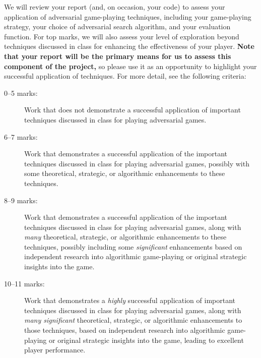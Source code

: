 \documentclass[]{article}
\begin{document}
\begin{itemize}
        We will review your report (and, on occasion, your code\footnotemark)
        to assess your application of adversarial game-playing techniques,
        including
        your game-playing strategy,
        your choice of adversarial search algorithm, and
        your evaluation function.
        For top marks, we will also assess your level of exploration beyond
        techniques discussed in class for enhancing the effectiveness of your
        player.
        \textbf{Note that your report will be the primary means for us to
        assess this component of the project,} so please use it as an
        opportunity to highlight your successful application of techniques.
        For more detail, see the following criteria:

        \begin{description}
            \item [0--5 marks:]
                Work that does not demonstrate a successful application of
                important techniques discussed in class for playing
                adversarial games.
            \item [6--7 marks:]
                Work that demonstrates a successful application of the
                important techniques discussed in class for playing
                adversarial games,
                possibly with some theoretical, strategic, or algorithmic
                enhancements to these techniques.
            \item [8--9 marks:]
                Work that demonstrates a successful application of the
                important techniques discussed in class for playing
                adversarial games,
                along with \emph{many} theoretical, strategic, or algorithmic 
                enhancements to these techniques,
                possibly including some \emph{significant} enhancements
                based on independent research into algorithmic game-playing
                or original strategic insights into the game.
            \item [10--11 marks:]
                Work that demonstrates a \emph{highly} successful application
                of important techniques discussed in class for playing
                adversarial games,
                along with \emph{many significant} theoretical, strategic,
                or algorithmic enhancements to those techniques,
                based on independent research into algorithmic game-playing
                or original strategic insights into the game,
                leading to excellent player performance.
        \end{description}

\end{itemize}
\end{document}
